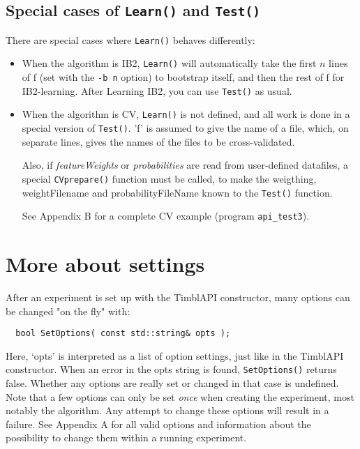 \documentclass{report}
\begin{document}
\subsection{Special cases of {\tt Learn()} and {\tt Test()}}

There are special cases where {\tt Learn()} behaves differently:

\begin{itemize}
\item When the algorithm is IB2, {\tt Learn()} will automatically take
  the first $n$ lines of f (set with the {\tt -b n} option) to
  bootstrap itself, and then the rest of f for IB2-learning. After
  Learning IB2, you can use {\tt Test()} as usual.

\item When the algorithm is CV, {\tt Learn()} is not defined, and all
  work is done in a special version of {\tt Test()}. 'f' is assumed to
  give the name of a file, which, on separate lines, gives the names
  of the files to be cross-validated.

  Also, if {\em featureWeights}\/ or {\em probabilities}\/ are read from 
  user-defined datafiles, a special {\tt CVprepare()} function must be called, 
  to make the weigthing, weightFilename and probabilityFileName known to the 
{\tt Test()} function.

See Appendix B for a complete CV example (program {\tt api\_test3}).


\end{itemize}

\section{More about settings}

After an experiment is set up with the TimblAPI constructor, many
options can be changed "on the fly" with:

\begin{footnotesize}
\begin{verbatim}
  bool SetOptions( const std::string& opts );
\end{verbatim}
\end{footnotesize}

Here, `opts' is interpreted as a list of option settings, just like in
the TimblAPI constructor. When an error in the opts string is found,
{\tt SetOptions()} returns false. Whether any options are really set
or changed in that case is undefined. Note that a few options can only
be set {\em once}\/ when creating the experiment, most notably the
algorithm. Any attempt to change these options will result in a
failure.  See Appendix A for all valid options and information about
the possibility to change them within a running experiment.
\end{document}
